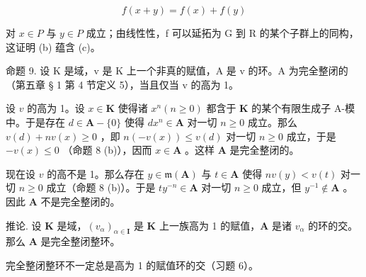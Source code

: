 \[
f (x + y) = f (x) + f (y)
\]

对 \(x \in P\) 与 \(y \in P\) 成立；由线性性，f 可以延拓为 G 到 R 的某个子群上的同构，这证明 (b) 蕴含 (c)。

命题 9. 设 K 是域，v 是 K 上一个非真的赋值，A 是 v 的环。A 为完全整闭的（第五章 § 1 第 4 节定义 5），当且仅当 v 的高为 1。

设 \(v\) 的高为 1。设 \(x \in \mathbf{K}\) 使得诸 \(x^n (n \geqslant 0)\) 都含于 \(\mathbf{K}\) 的某个有限生成子 A-模中。于是存在 \(d \in \mathbf{A} - \{0\}\) 使得 \(dx^n \in \mathbf{A}\) 对一切 \(n \geqslant 0\) 成立。那么 \(v(d) + nv(x) \geqslant 0\) ，即 \(n(-v(x)) \leqslant v(d)\) 对一切 \(n \geqslant 0\) 成立，于是 \(-v(x) \leqslant 0\) （命题 8 (b)），因而 \(x \in \mathbf{A}\) 。这样 \(\mathbf{A}\) 是完全整闭的。

现在设 \(v\) 的高不是 1。那么存在 \(y \in \mathfrak{m}(\mathbf{A})\) 与 \(t \in \mathbf{A}\) 使得 \(nv(y) < v(t)\) 对一切 \(n \geqslant 0\) 成立（命题 8 (b)）。于是 \(ty^{-n} \in \mathbf{A}\) 对一切 \(n \geqslant 0\) 成立，但 \(y^{-1} \notin \mathbf{A}\) 。因此 \(\mathbf{A}\) 不是完全整闭的。

推论. 设 \(\mathbf{K}\) 是域，\((v_{\alpha})_{\alpha \in \mathbf{I}}\) 是 \(\mathbf{K}\) 上一族高为 1 的赋值，\(\mathbf{A}\) 是诸 \(v_{\alpha}\) 的环的交。那么 \(\mathbf{A}\) 是完全整闭整环。

完全整闭整环不一定总是高为 1 的赋值环的交（习题 6）。

